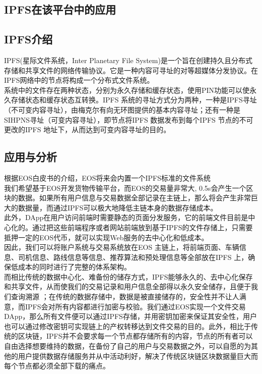 \documentclass[UTF8]{ctexart}
\begin{document}
\begin{multicols}{2}
\section{IPFS在该平台中的应用}
\subsection{IPFS介绍}
IPFS(星际文件系统，Inter Planetary File System)是一个旨在创建持久且分布式存储和共享文件的网络传输协议。它是一种内容可寻址的对等超媒体分发协议。在IPFS网络中的节点将构成一个分布式文件系统。\\
 系统中的文件存在两种状态，分别为永久存储和缓存状态，使用PIN功能可以使永久存储状态和缓存状态互转换。IPFS 系统的寻址方式分为两种，一种是IPFS寻址（不可变内容寻址），由梅克尔有向无环图提供的基本内容寻址；还有一种是SIHPNS寻址（可变内容寻址），即节点将IPFS 数据发布到每个IPFS 节点的不可更改的IPFS 地址下，从而达到可变内容寻址的目的。
\subsection{应用与分析}
根据EOS白皮书的介绍，EOS将来会内置一个IPFS标准的文件系统\cite{ref5}\\
\indent 我们希望基于EOS开发货物传输平台，而EOS的交易量非常大, 0.5s会产生一个区块的数据。如果所有用户信息与交易数据全部记录在主链上，那么将会产生非常巨大的数据量，而通过IPFS可以极大地降低主链本身的数据存储成本。\\
\indent 此外，DApp在用户访问前端时需要静态的页面分发服务，它的前端文件目前是中心化的。通过把这些前端程序或者网站前端放到基于IPFS的文件存储上，只需要抵押一定的EOS代币，就可以实现Web服务的去中心化和低成本。\\
因此，我们可以将账户系统与交易系统放在EOS 主链上，将前端页面、车辆信息、司机信息、路线信息等信息、推荐算法和预处理信息等全部放在IPFS 上，确保低成本的同时进行了完整的体系架构。\\
\indent 而相比传统的数据中心化、难备份的储存方式，IPFS能够永久的、去中心化保存和共享文件，从而使我们的交易记录和用户信息全部得以永久安全储存，且便于我们查询溯源 ；在传统的数据存储中，数据是被直接储存的，安全性并不让人满意，而IPFS会对所有内容都进行加密与校验。我们通过EOS实现一个文件交易DApp，那么所有文件便可以通过IPFS存储，并用密钥加密来保证其安全性，用户也可以通过修改密钥可实现链上的产权转移达到文件交易的目的。此外，相比于传统的区块链，IPFS并不会要求每一个节点都存储所有的内容，节点的所有者可以自由选择想要维持的数据，在备份了自己的用户与交易数据之外，可以自愿的为其他的用户提供数据存储服务并从中活动利好，解决了传统区块链区块数据量巨大而每个节点都必须全部下载的痛点。














\end{multicols}
\end{document}
